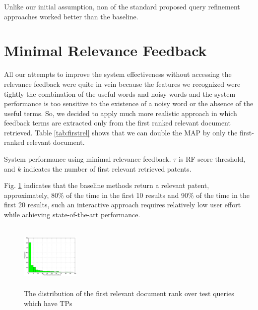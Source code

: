 \documentclass{sig-alternate}
\begin{document}
Unlike our initial assumption, non of the standard proposed query refinement approaches worked better than the baseline.
\section{Minimal Relevance Feedback}
All our attempts to improve the system effectiveness without accessing the relevance feedback were quite in vein because the features we recognized were tightly the combination of the useful words and noisy words and the system performance is too sensitive to the existence of a noisy word or the absence of the useful terms. So, we decided to apply much more realistic approach in which feedback terms are extracted only from the first ranked relevant document retrieved. Table \ref{tab:firstrel} shows that we can double the MAP by only the first-ranked relevant document.
\begin{table}[htpb]
  \begin{center}
   \caption{System performance using minimal relevance feedback. $\tau$ is RF score threshold, and $k$ indicates the number of first relevant retrieved patents.}\vspace{3mm}
     
  \label{tab:firstrel}
  \end{center}  
\end{table}
Fig. \ref{fig:FirstTPRankHisto} indicates that the baseline methods return a relevant patent, approximately, 80\% of the time in the first 10 results and 90\% of the time in the first 20 results, such an interactive approach requires relatively low user effort while achieving state-of-the-art performance.    
\begin{figure}[htpb]
   \centering
   \includegraphics[width=0.25\textwidth,height=32mm]{figs/FirstTPRank.eps}
   \caption{The distribution of the first relevant document rank over test queries which have TPs}   
   \label{fig:FirstTPRankHisto} 
\end{figure}
\end{document}
